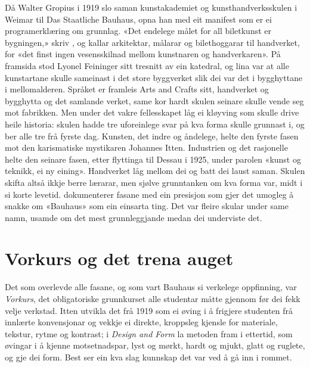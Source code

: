 Då Walter Gropius i 1919 slo saman kunstakademiet og kunsthandverksskulen i Weimar til Das Staatliche Bauhaus, opna han med eit manifest som er ei programerklæring om grunnlag. «Det endelege målet for all biletkunst er bygningen,» skriv \textcite{gropius1919}, og kallar arkitektar, målarar og bilethoggarar til handverket, for «det finst ingen vesensskilnad mellom kunstnaren og handverkaren». På framsida stod Lyonel Feininger sitt tresnitt av ein katedral, og lina var at alle kunstartane skulle sameinast i det store byggverket slik dei var det i bygghyttane i mellomalderen. Språket er framleis Arts and Crafts sitt, handverket og bygghytta og det samlande verket, same kor hardt skulen seinare skulle vende seg mot fabrikken. Men under det vakre fellesskapet låg ei kløyving som skulle drive heile historia: skulen hadde tre uforeinlege svar på kva forma skulle grunnast i, og ber alle tre frå fyrste dag. Kunsten, det indre og åndelege, helte den fyrste fasen mot den karismatiske mystikaren Johannes Itten. Industrien og det rasjonelle helte den seinare fasen, etter flyttinga til Dessau i 1925, under parolen «kunst og teknikk, ei ny eining». Handverket låg mellom dei og batt dei laust saman. Skulen skifta altså ikkje berre lærarar, men sjølve grunntanken om kva forma var, midt i si korte levetid. \textcite{droste2002bauhaus} dokumenterer fasane med ein presisjon som gjer det umogleg å snakke om «Bauhaus» som ein einsarta ting. Det var fleire skular under same namn, usamde om det mest grunnleggjande medan dei underviste det.

\section{Vorkurs og det trena auget}

Det som overlevde alle fasane, og som vart Bauhaus si verkelege oppfinning, var \emph{Vorkurs}, det obligatoriske grunnkurset alle studentar måtte gjennom før dei fekk velje verkstad. Itten utvikla det frå 1919 som ei øving i å frigjere studenten frå innlærte konvensjonar og vekkje ei direkte, kroppsleg kjensle for materiale, tekstur, rytme og kontrast; i \textit{Design and Form} la \textcite{itten1963} metoden fram i ettertid, som øvingar i å kjenne motsetnadspar, lyst og mørkt, hardt og mjukt, glatt og ruglete, og gje dei form. Best ser ein kva slag kunnskap det var ved å gå inn i rommet.

